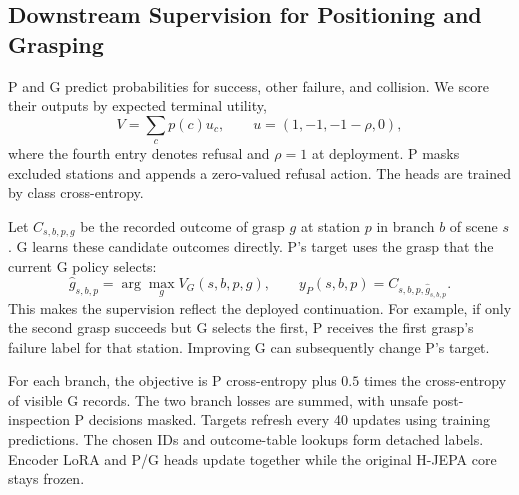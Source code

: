 \begin{samepage}
\subsection{Downstream Supervision for Positioning and Grasping}
P and G predict probabilities for success, other failure, and collision. We
score their outputs by expected terminal utility,
\begin{equation}
 V=\sum_c p(c)u_c,\qquad
 u=(1,-1,-1-\rho,0),
 \label{eq:utility}
\end{equation}
where the fourth entry denotes refusal and $\rho=1$ at deployment. P masks
excluded stations and appends a zero-valued refusal action. The heads are
trained by class cross-entropy.
\end{samepage}

Let $C_{s,b,p,g}$ be the recorded outcome of grasp $g$ at station $p$ in
branch $b$ of scene $s$. G learns these candidate outcomes directly. P's target
uses the grasp that the current G policy selects:
\begin{equation}
 \hat g_{s,b,p}=\arg\max_g V_G(s,b,p,g),\qquad
 y_P(s,b,p)=C_{s,b,p,\hat g_{s,b,p}}.
 \label{eq:pg_target}
\end{equation}
This makes the supervision reflect the deployed continuation. For example,
if only the second grasp succeeds but G selects the first, P receives the
first grasp's failure label for that station. Improving G can subsequently
change P's target.

For each branch, the objective is P cross-entropy plus $0.5$ times the
cross-entropy of visible G records. The two branch losses are summed, with
unsafe post-inspection P decisions masked. Targets refresh every 40 updates
using training predictions. The chosen IDs and outcome-table lookups form
detached labels. Encoder LoRA and P/G heads update together while the original
H-JEPA core stays frozen.
